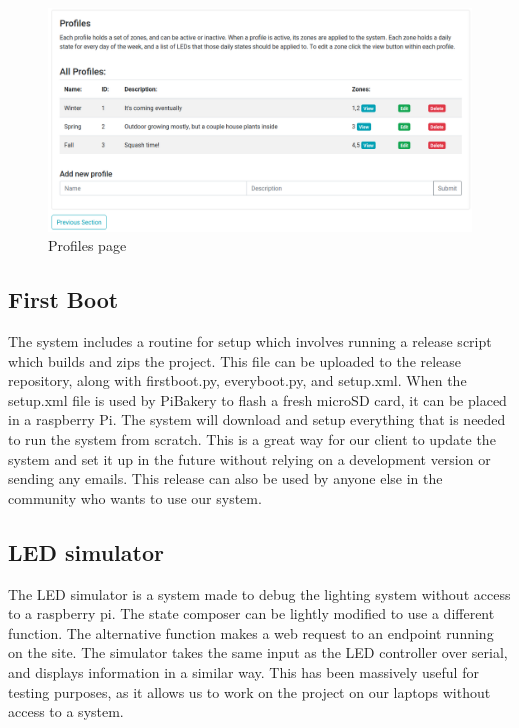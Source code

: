 \documentclass[onecolumn, draftclsnofoot,10pt, compsoc]{IEEEtran}
\begin{document}
		\begin{center}
			\begin{figure}[H]
				\includegraphics[width=\linewidth]{site/profiles.png}
				\caption{Profiles page}
				\label{fig:siteProfiles}
			\end{figure}
		\end{center}


	\subsection{First Boot}
		\noindent The system includes a routine for setup which involves running a release script which builds and zips the project.
		This file can be uploaded to the release repository, along with firstboot.py, everyboot.py, and setup.xml.
		When the setup.xml file is used by PiBakery to flash a fresh microSD card, it can be placed in a raspberry Pi.
		The system will download and setup everything that is needed to run the system from scratch.
		This is a great way for our client to update the system and set it up in the future without relying on a development version or sending any emails.
		This release can also be used by anyone else in the community who wants to use our system.
	\subsection{LED simulator}
		\noindent The LED simulator is a system made to debug the lighting system without access to a raspberry pi.
		The state composer can be lightly modified to use a different function. The alternative function makes a web request to an endpoint running on the site.
		The simulator takes the same input as the LED controller over serial, and displays information in a similar way.
		This has been massively useful for testing purposes, as it allows us to work on the project on our laptops without access to a system.
\end{document}
